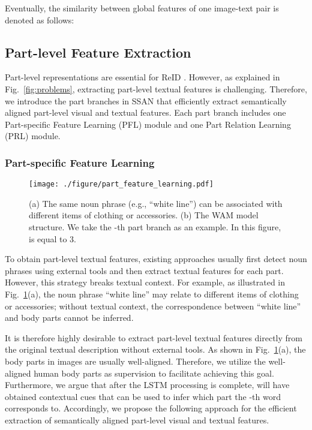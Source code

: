 \documentclass[journal]{IEEEtran}
\begin{document}
Eventually, the similarity between global features of one image-text pair is denoted as follows:


\subsection{Part-level Feature Extraction}\label{setion3.3}
Part-level representations are essential for ReID \cite{jing2020pose,niu2020improving,wang2020vitaa}. However, as explained in Fig.~\ref{fig:problems}, extracting part-level textual features is challenging. Therefore, we introduce the part branches in SSAN that efficiently extract semantically aligned part-level visual and textual features. Each part branch includes one Part-specific Feature Learning (PFL) module and one Part Relation Learning (PRL) module.

\subsubsection{Part-specific Feature Learning}

\begin{figure}[t]
\begin{center}
\texttt{[image: ./figure/part\_feature\_learning.pdf]}
\end{center}
   \caption{ (a) The same noun phrase (e.g., ``white line'') can be associated with different items of clothing or accessories. (b) The WAM model structure. We take the -th part branch as an example. In this figure,  is equal to 3.}
\label{fig:part_feature_learning}
\end{figure}

To obtain part-level textual features, existing approaches \cite{jing2020pose,niu2020improving,wang2020vitaa} usually first detect noun phrases using external tools  and then extract textual features for each part. However, this strategy breaks textual context. For example, as illustrated in Fig.~\ref{fig:part_feature_learning}(a), the noun phrase ``white line'' may relate to different items of clothing or accessories; without textual context, the correspondence between ``white line'' and body parts cannot be inferred.

It is therefore highly desirable to extract part-level textual features directly from the original textual description without external tools. As shown in Fig.~\ref{fig:part_feature_learning}(a), the body parts in images are usually well-aligned. Therefore, we utilize the well-aligned human body parts as supervision to facilitate achieving this goal. Furthermore, we argue that after the LSTM processing is complete,   will have obtained contextual cues that can be used to infer which part the -th word corresponds to. Accordingly, we propose the following approach for the efficient extraction of semantically aligned part-level visual and textual features.
\end{document}
